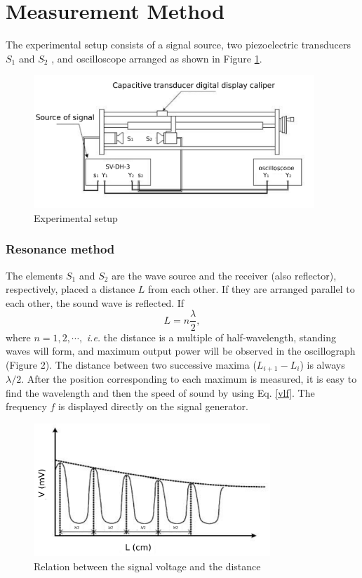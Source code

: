 \section{Measurement Method}

    The experimental setup consists of a signal source, two piezoelectric transducers $S_1$ and $S_2$ , and oscilloscope arranged as shown in Figure \ref{app}.
    \begin{figure}[H]
        \centering
        \includegraphics[height=5cm]{fig/es1}
        \caption{Experimental setup}\label{app}
    \end{figure}


\subsubsection{Resonance method}
    The elements $S_1$ and $S_2$ are the wave source and the receiver (also reflector), respectively, placed a distance $L$ from each other. If they are arranged parallel to each other, the sound wave is reflected. If
    \begin{equation}\label{equ_res}
        L=n\frac{\lambda}{2},
    \end{equation}
    where $n=1,2,\cdots,$ \emph{i.e.} the distance is a multiple of half-wavelength, standing waves will form, and maximum output power will be observed in the oscillograph (Figure 2). The distance between two successive maxima ($L_{i+1} - L_i$) is always $\lambda/2$. After the position corresponding to each maximum is measured, it is easy to find the wavelength and then the speed of sound by using Eq. \ref{vlf}. The frequency $f$ is displayed directly on the signal generator.
    \begin{figure}[h]
        \centering
        \includegraphics[height=5cm]{fig/r}
        \caption{Relation between the signal voltage and the distance}\label{vL}
    \end{figure}

